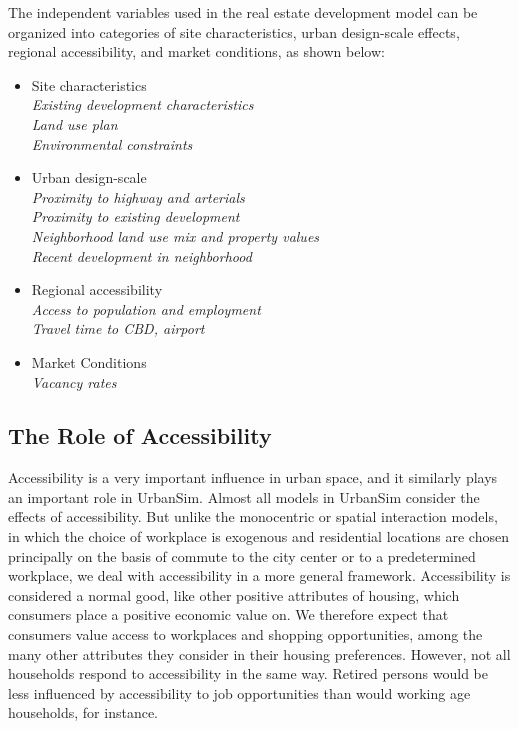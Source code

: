 The independent variables used in the real estate development
model can be organized into categories of site characteristics,
urban design-scale effects, regional accessibility, and market
conditions, as shown below:

\begin{itemize}
\item Site characteristics \\
\emph{Existing development characteristics \\
Land use plan \\
Environmental constraints}

\item Urban design-scale \\
\emph{Proximity to highway and arterials \\
Proximity to existing development \\
Neighborhood land use mix and property values \\
Recent development in neighborhood}

\item Regional accessibility \\
\emph{Access to population and employment \\
Travel time to CBD, airport}

\item Market Conditions \\
\emph{Vacancy rates}
\end{itemize}

\subsection{The Role of Accessibility}

Accessibility is a very important influence in urban space, and it
similarly plays an important role in UrbanSim.  Almost all models
in UrbanSim consider the effects of accessibility.  But unlike
the monocentric or spatial interaction models, in which the choice
of workplace is exogenous and
residential locations are chosen principally on the basis of
commute to the city center or to a predetermined workplace, we
deal with accessibility in a more general framework. Accessibility
is considered a normal good, like other positive attributes of
housing, which consumers place a positive economic value on.  We
therefore expect that consumers value access to workplaces and
shopping opportunities, among the many other attributes they
consider in their housing preferences. However, not all households
respond to accessibility in the same way. Retired persons would be
less influenced by accessibility to job opportunities than would
working age households, for instance.

